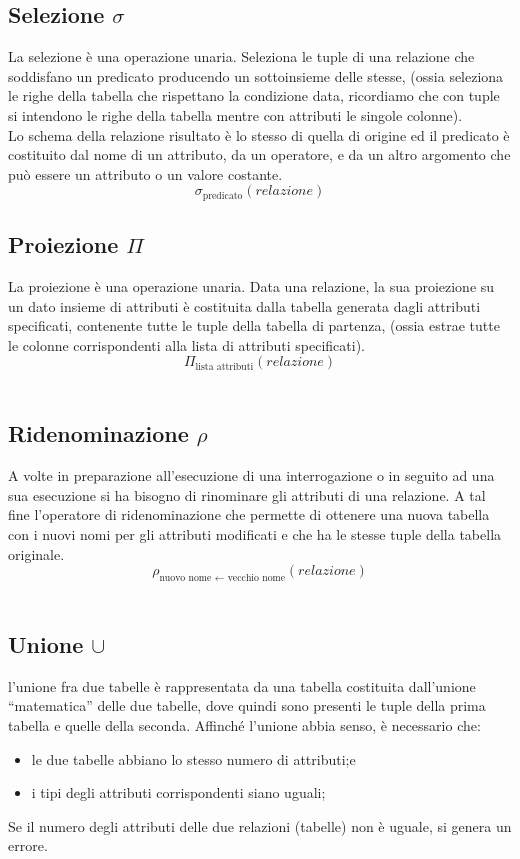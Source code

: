 \documentclass{report}
\begin{document}
\subsection{Selezione $\sigma$}
La selezione è una operazione unaria. Seleziona le tuple di una relazione che soddisfano un predicato
producendo un sottoinsieme delle stesse, (ossia seleziona le righe della tabella che rispettano la condizione data, ricordiamo che con tuple si intendono le righe della tabella mentre con attributi le singole colonne).\\
Lo schema della relazione risultato è lo stesso di quella di origine ed il predicato è costituito dal nome di un attributo, da un operatore, e da un altro argomento che può essere un attributo o un valore
costante.\\
$$\sigma_{\text{predicato}}(relazione)$$

\subsection{Proiezione $\Pi$}
La proiezione è una operazione unaria. Data una relazione, la sua proiezione su un dato insieme di attributi è costituita dalla tabella generata dagli attributi specificati, contenente tutte le tuple della tabella di partenza, (ossia estrae tutte le colonne corrispondenti alla lista di attributi specificati).\\
$$\Pi_{\text{lista attributi}}(relazione)$$\\

\subsection{Ridenominazione $\rho$}
A volte in preparazione all’esecuzione di una interrogazione o in seguito ad una sua esecuzione si ha bisogno di rinominare gli attributi di una relazione. A tal fine l’operatore di ridenominazione che permette di ottenere una nuova tabella con i nuovi nomi per gli attributi modificati e che ha le stesse tuple della tabella originale.\\
$$\rho_{\text{nuovo nome $\leftarrow$ vecchio nome}}(relazione)$$\\

\subsection{Unione $\cup$}
l’unione fra due tabelle è rappresentata da una tabella costituita dall’unione “matematica” delle due tabelle, dove quindi sono presenti le tuple della prima tabella e quelle della seconda. Affinché l’unione abbia senso, è necessario che:
\begin{itemize}
    \item le due tabelle abbiano lo stesso numero di attributi;e
    \item i tipi degli attributi corrispondenti siano uguali;
\end{itemize}
Se il numero degli attributi delle due relazioni (tabelle) non è uguale, si genera un errore.\\
\end{document}
